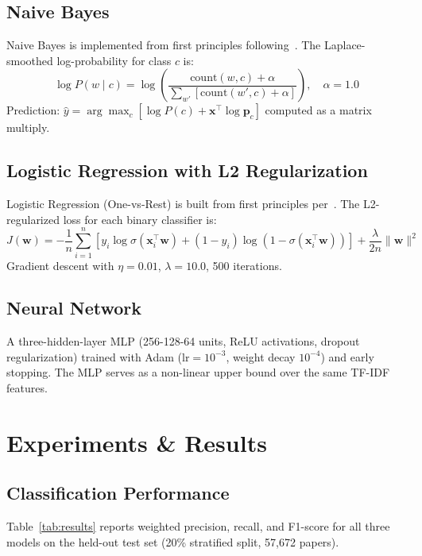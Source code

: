 \documentclass{article}
\begin{document}
\subsection{Naive Bayes}

Naive Bayes is implemented from first principles following~\cite{princetondml}. The Laplace-smoothed log-probability for class $c$ is:
\begin{equation}
    \log P(w \mid c) = \log\!\left(\frac{\text{count}(w, c) + \alpha}{\sum_{w'} [\text{count}(w', c) + \alpha]}\right), \quad \alpha = 1.0
\end{equation}
Prediction: $\hat{y} = \arg\max_c \left[\log P(c) + \mathbf{x}^\top \log \mathbf{p}_c\right]$ computed as a matrix multiply.

\subsection{Logistic Regression with L2 Regularization}

Logistic Regression (One-vs-Rest) is built from first principles per~\cite{princetondml}. The L2-regularized loss for each binary classifier is:
\begin{equation}
    J(\mathbf{w}) = -\frac{1}{n}\sum_{i=1}^{n}\!\left[y_i \log \sigma(\mathbf{x}_i^\top \mathbf{w}) + (1-y_i)\log(1-\sigma(\mathbf{x}_i^\top \mathbf{w}))\right] + \frac{\lambda}{2n}\|\mathbf{w}\|^2
\end{equation}
Gradient descent with $\eta = 0.01$, $\lambda = 10.0$, 500 iterations.

\subsection{Neural Network}

A three-hidden-layer MLP (256-128-64 units, ReLU activations, dropout regularization) trained with Adam ($\text{lr} = 10^{-3}$, weight decay $10^{-4}$) and early stopping. The MLP serves as a non-linear upper bound over the same TF-IDF features.

\section{Experiments \& Results}

\subsection{Classification Performance}

Table~\ref{tab:results} reports weighted precision, recall, and F1-score for all three models on the held-out test set (20\% stratified split, 57,672 papers).
\end{document}
